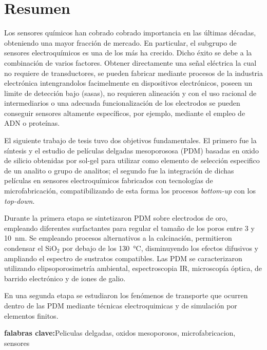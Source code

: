 \mtcaddchapter[Resumen]

\section*{\centering Resumen}

Los sensores químicos han cobrado cobrado importancia en las últimas décadas, obteniendo una mayor fracción de mercado. En particular, el subgrupo de sensores electroquímicos es una de los más ha crecido. Dicho éxito se debe a la combinación de varios factores. Obtener directamente una señal eléctrica la cual no requiere de transductores, se pueden fabricar mediante procesos de la industria electrónica intengrandolos facimelmente en dispositivos electrónicos, poseen un limite de detección bajo (sasas), no requieren alineación y con el uso racional de intermediarios o una adecuada funcionalización de los electrodos se pueden conseguir sensores altamente específicos, por ejemplo, mediante el empleo de ADN o proteínas.

El siguiente trabajo de tesis tuvo dos objetivos fundamentales. El primero fue la síntesis  y el estudio de películas delgadas mesoporososa (PDM) basadas en oxido de silicio obtenidas por sol-gel para utilizar como elemento de selección especifico de un analito o grupo de analitos; el segundo fue la integración de dichas películas en sensores electroquímicos fabricados con tecnologías de microfabricación, compatibilizando de esta forma los procesos \textit{bottom-up} con los \textit{top-down}.

Durante la primera etapa se sintetizaron PDM sobre electrodos de oro, empleando diferentes surfactantes para regular el tamaño de los poros entre 3 y \SI{10}{\nm}. Se empleando procesos alternativos a la calcinación, permitieron condensar el SiO$_2$ por debajo de los \SI{130}{\celsius}, disminuyendo los efectos difusivos y ampliando el espectro de sustratos compatibles. Las PDM se caracterizaron utilizando elipsoporosimetría ambiental, espectroscopia IR, microscopía óptica, de barrido electrónico y de iones de galio.

En una segunda etapa se estudiaron los fenómenos de transporte que ocurren dentro de las PDM mediante técnicas electroquimicas y de simulación por elementos finitos. 

\vfill

\noindent\textbf{falabras clave:}Peliculas delgadas, oxidos mesoporosos, microfabricacion, sensores

\cleardoublepage
